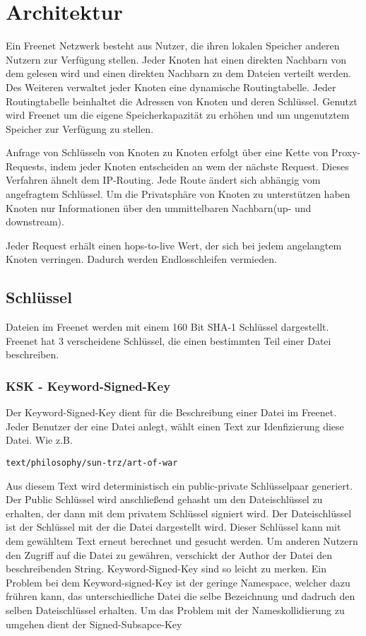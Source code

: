 \section{Architektur}
Ein Freenet Netzwerk besteht aus Nutzer, die ihren lokalen Speicher anderen
Nutzern zur Verfügung stellen. Jeder Knoten hat einen direkten Nachbarn von dem
gelesen wird und einen direkten Nachbarn zu dem Dateien verteilt werden.
Des Weiteren verwaltet jeder Knoten eine dynamische Routingtabelle. Jeder
Routingtabelle beinhaltet die Adressen von Knoten und deren Schlüssel.
Genutzt wird Freenet um die eigene Speicherkapazität zu erhöhen und um
ungenutztem Speicher zur Verfügung zu stellen.

Anfrage von Schlüsseln von Knoten zu Knoten erfolgt über eine Kette von
Proxy-Requests, indem jeder Knoten entscheiden an wem der nächste Request.
Dieses Verfahren ähnelt dem IP-Routing. Jede Route ändert sich abhängig vom
angefragtem Schlüssel.
Um die Privatsphäre von Knoten zu unterstützen haben Knoten nur Informationen
über den ummittelbaren Nachbarn(up- und downstream).

Jeder Request erhält einen hops-to-live Wert, der sich bei jedem angelangtem
Knoten verringen. Dadurch werden Endlosschleifen vermieden.

\subsection{Schlüssel}
Dateien im Freenet werden mit einem 160 Bit SHA-1 Schlüssel dargestellt.
Freenet hat 3 verscheidene Schlüssel, die einen bestimmten Teil einer Datei
beschreiben.

\subsubsection{KSK - Keyword-Signed-Key}
Der Keyword-Signed-Key dient für die Beschreibung einer Datei im Freenet. Jeder
Benutzer der eine Datei anlegt, wählt einen Text zur Idenfizierung diese
Datei. Wie z.B.
\begin{lstlisting}
text/philosophy/sun-trz/art-of-war
\end{lstlisting}
Aus diesem Text wird deterministisch ein public-private Schlüsselpaar
generiert. Der Public Schlüssel wird anschließend gehasht um den Dateischlüssel
zu erhalten, der dann mit dem privatem Schlüssel signiert wird.  Der
Dateischlüssel ist der Schlüssel mit der die Datei dargestellt wird. Dieser
Schlüssel kann mit dem gewähltem Text erneut berechnet und gesucht werden.  Um
anderen Nutzern den Zugriff auf die Datei zu gewähren, verschickt der Author
der Datei den beschreibenden String. Keyword-Signed-Key sind so leicht zu
merken.  Ein Problem bei dem Keyword-signed-Key ist der geringe Namespace,
welcher dazu frühren kann, das unterschiedliche Datei die selbe Bezeichnung und
dadruch den selben Dateischlüssel erhalten. Um das Problem mit der
Nameskollidierung zu umgehen dient der Signed-Subsapce-Key

